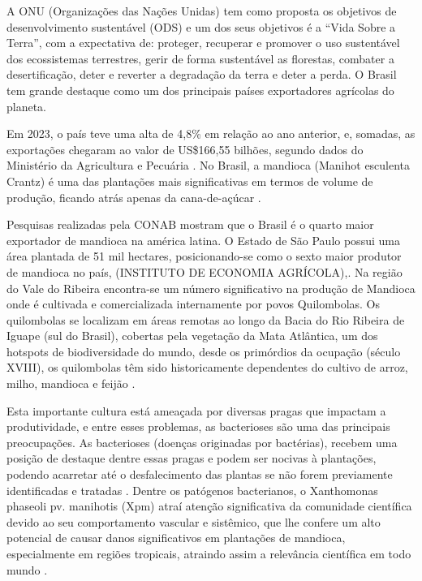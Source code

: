 A ONU (Organizações das Nações Unidas) tem como proposta os objetivos de desenvolvimento sustentável (ODS) e um dos seus objetivos é a “Vida Sobre a Terra”, com a expectativa de: proteger, recuperar e promover o uso sustentável dos ecossistemas terrestres, gerir de forma sustentável as florestas, combater a desertificação, deter e reverter a degradação da terra e deter a perda.  O Brasil tem grande destaque como um dos principais países exportadores agrícolas do planeta.

Em 2023, o país teve uma alta de 4,8\% em relação ao ano anterior, e, somadas, as exportações chegaram ao valor de US\$166,55 bilhões, segundo dados do Ministério da Agricultura e Pecuária \textcite{MAPA:11}. No Brasil, a mandioca (Manihot esculenta Crantz) é uma das plantações mais significativas em termos de volume de produção, ficando atrás apenas da cana-de-açúcar \cite{FURLANETO}. 

Pesquisas realizadas pela CONAB mostram que o Brasil é o quarto maior exportador de mandioca na américa latina. O Estado de São Paulo possui uma área plantada de 51 mil hectares, posicionando-se como o sexto maior produtor de mandioca no país, (INSTITUTO DE ECONOMIA AGRÍCOLA),\textcite{CONAB}. Na região do Vale do Ribeira encontra-se um número significativo na produção de Mandioca onde é cultivada e comercializada internamente por povos Quilombolas. Os quilombolas se localizam em áreas remotas ao longo da Bacia do Rio Ribeira de Iguape (sul do Brasil), cobertas pela vegetação da Mata Atlântica, um dos hotspots de biodiversidade do mundo, desde os primórdios da ocupação (século XVIII), os quilombolas têm sido historicamente dependentes do cultivo de arroz, milho, mandioca e feijão \cite{Prado}.

Esta importante cultura está ameaçada por diversas pragas que impactam a produtividade, e entre esses problemas, as bacterioses são uma das principais preocupações. As bacterioses (doenças originadas por bactérias), recebem uma posição de destaque dentre essas pragas e podem ser nocivas à plantações, podendo acarretar até o desfalecimento das plantas se não forem previamente identificadas e tratadas \textcite{Embrapa}. Dentre os patógenos bacterianos, o Xanthomonas phaseoli pv. manihotis (Xpm) atraí atenção significativa da comunidade científica devido ao seu comportamento vascular e sistêmico, que lhe confere um alto potencial de causar danos significativos em plantações de mandioca, especialmente em regiões tropicais, atraindo assim a relevância científica em todo mundo \cite{MANSFIELD}.

